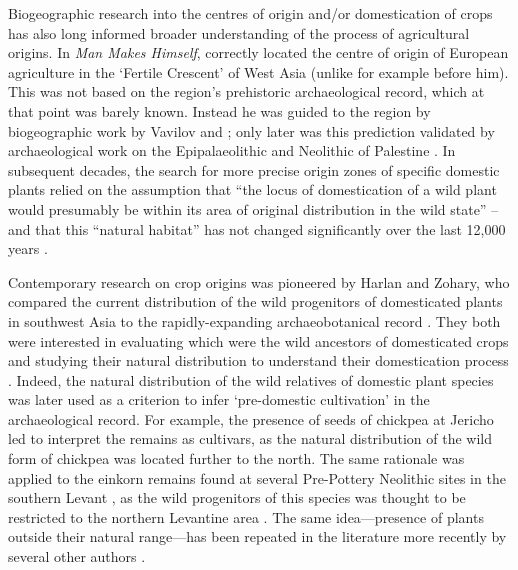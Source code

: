 \documentclass[
  authoryear,
  preprint]{elsarticle}
\begin{document}
Biogeographic research into the centres of origin and/or domestication
of crops has also long informed broader understanding of the process of
agricultural origins. In \emph{Man Makes Himself}, \citet{Childe1936}
correctly located the centre of origin of European agriculture in the
`Fertile Crescent' of West Asia (unlike for example \citet{Pumpelly1908}
before him). This was not based on the region's prehistoric
archaeological record, which at that point was barely known. Instead he
was guided to the region by biogeographic work by Vavilov and
\citet{PeakeFleure1927}; only later was this prediction validated by
archaeological work on the Epipalaeolithic and Neolithic of Palestine
\citep{Boyd2018}. In subsequent decades, the search for more precise
origin zones of specific domestic plants relied on the assumption that
``the locus of domestication of a wild plant would presumably be within
its area of original distribution in the wild state''
\citetext{\citealp{Butzer1971}; \citealp[paraphrasing][]{Helbaek1959}}
-- and that this ``natural habitat'' has not changed significantly over
the last 12,000 years \citep{Butzer1971}.

Contemporary research on crop origins was pioneered by Harlan and
Zohary, who compared the current distribution of the wild progenitors of
domesticated plants in southwest Asia
\citep{HarlanZohary1966, Zohary1969, Zohary1973, ZoharyHopf1973} to the
rapidly-expanding archaeobotanical record
\citetext{\citealp{Harlan1971}; \citealp{Harlan1977}; \citealp[see
also][]{ZoharyHopf1988}; \citealp{HarlanZohary1966}}. They both were
interested in evaluating which were the wild ancestors of domesticated
crops and studying their natural distribution to understand their
domestication process
\citep{Zohary1969, Zohary1973, ZoharySpiegelRoy1975}. Indeed, the
natural distribution of the wild relatives of domestic plant species was
later used as a criterion to infer `pre-domestic cultivation' in the
archaeological record. For example, the presence of seeds of chickpea at
Jericho led \citet{Hopf1986} to interpret the remains as cultivars, as
the natural distribution of the wild form of chickpea was located
further to the north. The same rationale was applied to the einkorn
remains found at several Pre-Pottery Neolithic sites in the southern
Levant \citep{Hopf1969, Colledge2001}, as the wild progenitors of this
species was thought to be restricted to the northern Levantine area
\citep{HeunEtAl1997, ZoharyEtAl2012}. The same idea---presence of plants
outside their natural range---has been repeated in the literature more
recently by several other authors
\citep{TannoWillcox2006, WillcoxEtAl2008, HillmanEtAl2001}.
\end{document}
